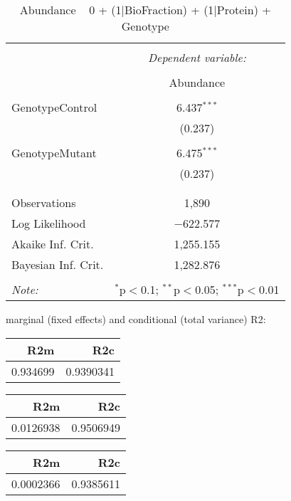 \documentclass[11pt]{report}
\begin{document}
\begin{table}[!htbp] \centering 
  \caption{Abundance ~ 0 + (1|BioFraction) + (1|Protein) + Genotype} 
  \label{} 
\begin{tabular}{@{\extracolsep{5pt}}lc} 
\\[-1.8ex]\hline 
\hline \\[-1.8ex] 
 & \multicolumn{1}{c}{\textit{Dependent variable:}} \\ 
\cline{2-2} 
\\[-1.8ex] & Abundance \\ 
\hline \\[-1.8ex] 
 GenotypeControl & 6.437$^{***}$ \\ 
  & (0.237) \\ 
  & \\ 
 GenotypeMutant & 6.475$^{***}$ \\ 
  & (0.237) \\ 
  & \\ 
\hline \\[-1.8ex] 
Observations & 1,890 \\ 
Log Likelihood & $-$622.577 \\ 
Akaike Inf. Crit. & 1,255.155 \\ 
Bayesian Inf. Crit. & 1,282.876 \\ 
\hline 
\hline \\[-1.8ex] 
\textit{Note:}  & \multicolumn{1}{r}{$^{*}$p$<$0.1; $^{**}$p$<$0.05; $^{***}$p$<$0.01} \\ 
\end{tabular} 
\end{table} 
marginal (fixed effects) and conditional (total variance) R2:

\begin{tabular}{r|r}
\hline
R2m & R2c\\
\hline
0.934699 & 0.9390341\\
\hline
\end{tabular}

\begin{tabular}{r|r}
\hline
R2m & R2c\\
\hline
0.0126938 & 0.9506949\\
\hline
\end{tabular}

\begin{tabular}{r|r}
\hline
R2m & R2c\\
\hline
0.0002366 & 0.9385611\\
\hline
\end{tabular}
\end{document}

